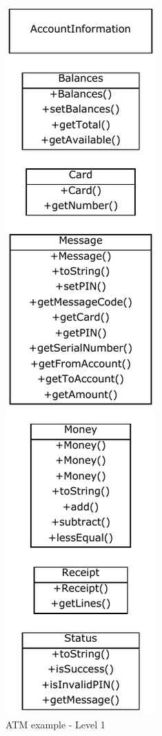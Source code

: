 \begin{figure}[!ht]
\centering
\begin{minipage}[b]{0.47\linewidth}
\includegraphics{Figures/Example2a1.pdf}
\caption{ATM example - Level 1}

\end{minipage}
\end{figure}
